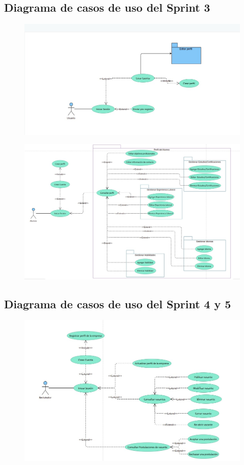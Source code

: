 \subsection{Diagrama de casos de uso del Sprint 3}
\begin{figure}[hbtp!]
	\begin{center}
		\includegraphics[width=.8\textwidth]{analisisydiseno/imagenes/cuALumno.jpeg}
	\end{center}
	\label{fig:nomenclatura}
\end{figure}

\begin{figure}[hbtp!]
	\begin{center}
		\includegraphics[width=.9\textwidth]{analisisydiseno/imagenes/cu2.jpeg}
	\end{center}
	\label{fig:nomenclatura}
\end{figure}
\clearpage
\subsection{Diagrama de casos de uso del Sprint 4 y 5}
\begin{figure}[hbtp!]
	\begin{center}
		\includegraphics[width=.7\textwidth]{analisisydiseno/imagenes/cu3.jpeg}
	\end{center}
	\label{fig:nomenclatura}
\end{figure}


